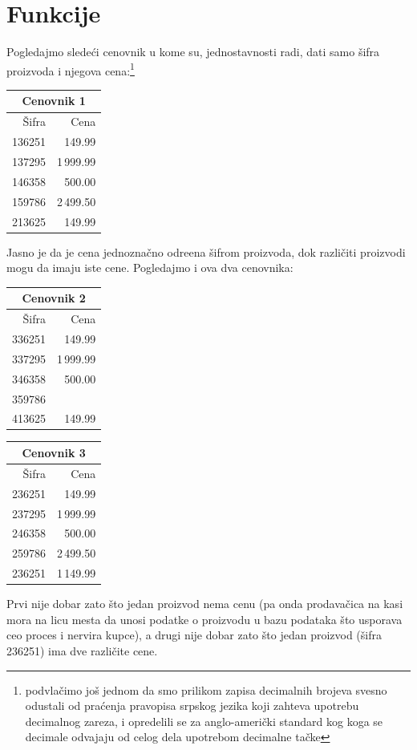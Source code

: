 \chapter{Funkcije}


Pogledajmo slede\'ci cenovnik u kome su, jednostavnosti radi, dati samo \v sifra proizvoda i njegova cena:\footnote{%
podvla\v cimo jo\v s jednom da smo prilikom zapisa decimalnih brojeva svesno odustali od pra\'cenja
pravopisa srpskog jezika koji zahteva upotrebu decimalnog zareza, i opredelili se za anglo-ameri\v cki
standard kog koga se decimale odvajaju od celog dela upotrebom decimalne ta\v cke}
\begin{center}
  \begin{tabular}{|r|r|}
  \multicolumn{2}{c}{Cenovnik 1}\\
  \hline
  \v Sifra & Cena \\
  \hline
  136251 &    149.99 \\
  137295 & 1\,999.99 \\
  146358 &    500.00 \\
  159786 & 2\,499.50 \\
  213625 &    149.99 \\
  \hline
  \end{tabular}
\end{center}
Jasno je da je cena jednozna\v cno odre\dj ena \v sifrom proizvoda, dok razli\v citi proizvodi
mogu da imaju iste cene. Pogledajmo i ova dva cenovnika:
\begin{center}
  \begin{tabular}{|r|r|}
  \multicolumn{2}{c}{Cenovnik 2}\\
  \hline
  \v Sifra & Cena \\
  \hline
  336251 &    149.99 \\
  337295 & 1\,999.99 \\
  346358 &    500.00 \\
  359786 &          \\
  413625 &    149.99 \\
  \hline
  \end{tabular}
  \qquad
  \begin{tabular}{|r|r|}
  \multicolumn{2}{c}{Cenovnik 3}\\
  \hline
  \v Sifra & Cena \\
  \hline
  236251 &    149.99 \\
  237295 & 1\,999.99 \\
  246358 &    500.00 \\
  259786 & 2\,499.50 \\
  236251 & 1\,149.99 \\
  \hline
  \end{tabular}
\end{center}
Prvi nije dobar zato \v sto jedan proizvod nema cenu (pa onda prodava\v cica na kasi mora na licu mesta da unosi
podatke o proizvodu u bazu podataka \v sto usporava ceo proces i nervira kupce), a drugi nije dobar zato \v sto
jedan proizvod (\v sifra 236251) ima dve razli\v cite cene.

